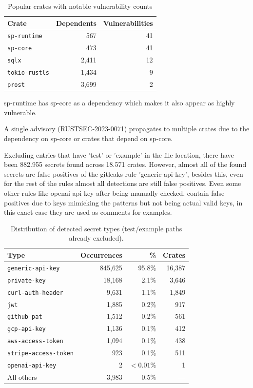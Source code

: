 \begin{table}[ht]
\centering
\begin{tabular}{|l|r|r|}
\hline
\textbf{Crate} & \textbf{Dependents} & \textbf{Vulnerabilities} \\
\hline
\texttt{sp-runtime} & 567 & 41 \\
\hline
\texttt{sp-core} & 473 & 41 \\
\hline
\texttt{sqlx} & 2{,}411 & 12 \\
\hline
\texttt{tokio-rustls} & 1{,}434 & 9 \\
\hline
\texttt{prost} & 3{,}699 & 2 \\
\hline
\end{tabular}
\caption{Popular crates with notable vulnerability counts}
\label{tab:popular-vulnerable-crates}
\end{table}

sp-runtime has sp-core as a dependency which makes it also appear as highly vulnerable.

A single advisory (RUSTSEC-2023-0071) propagates to multiple crates due to the dependency on sp-core or crates that depend on sp-core.

Excluding entries that have 'test' or 'example' in the file location, there have been 882.955 secrets found across 18.571 crates. However, almost all of the found secrets are false positives of the gitleaks rule 'generic-api-key', besides this, even for the rest of the rules almost all detections are still false positives. Even some other rules like openai-api-key after being manually checked, contain false positives due to keys mimicking the patterns but not being actual valid keys, in this exact case they are used as comments for examples.

\begin{table}[ht]
\centering
\begin{tabular}{|l|r|r|r|}
\hline
\textbf{Type} & \textbf{Occurrences} & \textbf{\%} & \textbf{Crates} \\
\hline
\texttt{generic-api-key} & 845{,}625 & 95.8\% & 16{,}387 \\
\hline
\texttt{private-key} & 18{,}168 & 2.1\% & 3{,}646 \\
\hline
\texttt{curl-auth-header} & 9{,}631 & 1.1\% & 1{,}849 \\
\hline
\texttt{jwt} & 1{,}885 & 0.2\% & 917 \\
\hline
\texttt{github-pat} & 1{,}512 & 0.2\% & 561 \\
\hline
\texttt{gcp-api-key} & 1{,}136 & 0.1\% & 412 \\
\hline
\texttt{aws-access-token} & 1{,}094 & 0.1\% & 438 \\
\hline
\texttt{stripe-access-token} & 923 & 0.1\% & 511 \\
\hline
\texttt{openai-api-key} & 2 & $<0.01\%$ & 1 \\
\hline
All others & 3{,}983 & 0.5\% & --- \\
\hline
\end{tabular}
\caption{Distribution of detected secret types (test/example paths already excluded).}
\label{tab:secret-type-distribution}
\end{table}

